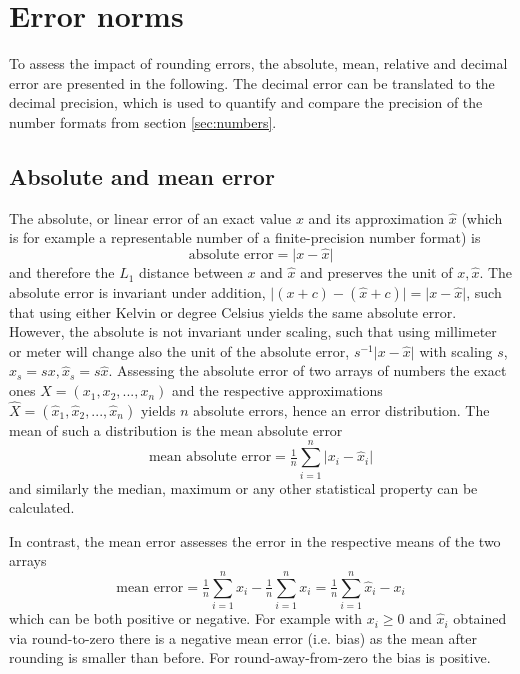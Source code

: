 \section{Error norms}
\label{sec:error_norms}

To assess the impact of rounding errors, the absolute, mean, relative and decimal error are presented in the following.
The decimal error can be translated to the decimal precision, which is used to quantify and compare the precision of the
number formats from section \ref{sec:numbers}. 

\subsection{Absolute and mean error}
\label{sec:absmean_error}

The absolute, or linear error of an exact value $x$ and its approximation $\hat{x}$ (which is for example a representable number of
a finite-precision number format) is 
\begin{equation}
	\text{absolute error} = \vert x - \hat{x} \vert
	\label{eq:abserror}
\end{equation}
and therefore the $L_1$ distance between $x$ and $\hat{x}$ and preserves the unit of $x,\hat{x}$. The absolute error is invariant under addition,
$\vert (x+c) - (\hat{x} + c)\vert = \vert x - \hat{x} \vert$, such that using either Kelvin or degree Celsius yields the same absolute error.
However, the absolute is not invariant under scaling, such that using millimeter or meter will change also the unit of the absolute error,
$s^{-1}\vert x - \hat{x} \vert$ with scaling $s$, $x_s = sx, \hat{x}_s = s\hat{x}$. Assessing the absolute error of two arrays of numbers
the exact ones $X = (x_1,x_2,...,x_n)$ and the respective approximations $\hat{X} = (\hat{x}_1,\hat{x}_2,...,\hat{x}_n)$ yields $n$ 
absolute errors, hence an error distribution. The mean of such a distribution is the mean absolute error
\begin{equation}
	\text{mean absolute error} = \tfrac{1}{n} \sum_{i=1}^n \vert x_i - \hat{x}_i \vert
	\label{eq:meanabserror}
\end{equation}
and similarly the median, maximum or any other statistical property can be calculated.

In contrast, the mean error assesses the error in the respective means of the two arrays
\begin{equation}
	\text{mean error} = \tfrac{1}{n}\sum_{i=1}^n \hat{x}_i - \tfrac{1}{n}\sum_{i=1}^n x_i = \tfrac{1}{n} \sum_{i=1}^n \hat{x}_i - x_i
	\label{eq:meanerror}
\end{equation}
which can be both positive or negative. For example with $x_i \geq 0$ and $\hat{x}_i$ obtained via round-to-zero there is a
negative mean error (i.e. bias) as the mean after rounding is smaller than before. For round-away-from-zero the bias is
positive.

